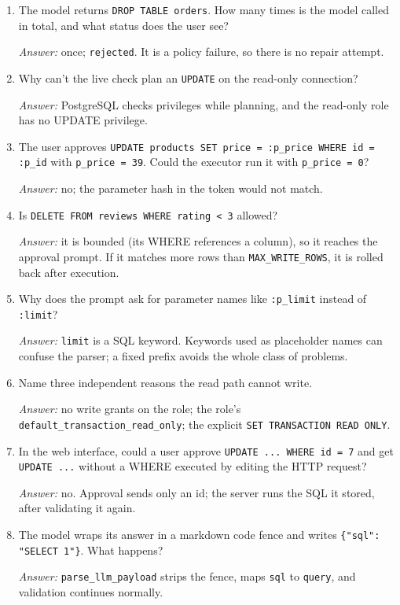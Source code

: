 \documentclass[11pt,a4paper]{article}
\begin{document}
\begin{enumerate}[leftmargin=*, label=\textbf{Q\arabic*.}]
  \item The model returns \texttt{DROP TABLE orders}. How many times is the
        model called in total, and what status does the user see?

        \emph{Answer:} once; \texttt{rejected}. It is a policy failure, so
        there is no repair attempt.

  \item Why can't the live check plan an \texttt{UPDATE} on the read-only
        connection?

        \emph{Answer:} PostgreSQL checks privileges while planning, and the
        read-only role has no UPDATE privilege.

  \item The user approves \texttt{UPDATE products SET price = :p\_price WHERE
        id = :p\_id} with \texttt{p\_price = 39}. Could the executor run it
        with \texttt{p\_price = 0}?

        \emph{Answer:} no; the parameter hash in the token would not match.

  \item Is \texttt{DELETE FROM reviews WHERE rating < 3} allowed?

        \emph{Answer:} it is bounded (its WHERE references a column), so it
        reaches the approval prompt. If it matches more rows than
        \texttt{MAX\_WRITE\_ROWS}, it is rolled back after execution.

  \item Why does the prompt ask for parameter names like \texttt{:p\_limit}
        instead of \texttt{:limit}?

        \emph{Answer:} \texttt{limit} is a SQL keyword. Keywords used as
        placeholder names can confuse the parser; a fixed prefix avoids the
        whole class of problems.

  \item Name three independent reasons the read path cannot write.

        \emph{Answer:} no write grants on the role; the role's
        \texttt{default\_transaction\_read\_only}; the explicit
        \texttt{SET TRANSACTION READ ONLY}.

  \item In the web interface, could a user approve
        \texttt{UPDATE ... WHERE id = 7} and get
        \texttt{UPDATE ...} without a WHERE executed by editing the HTTP request?

        \emph{Answer:} no. Approval sends only an id; the server runs the SQL it
        stored, after validating it again.

  \item The model wraps its answer in a markdown code fence and writes
        \texttt{\{"sql": "SELECT 1"\}}. What happens?

        \emph{Answer:} \texttt{parse\_llm\_payload} strips the fence, maps
        \texttt{sql} to \texttt{query}, and validation continues normally.
\end{enumerate}
\end{document}
